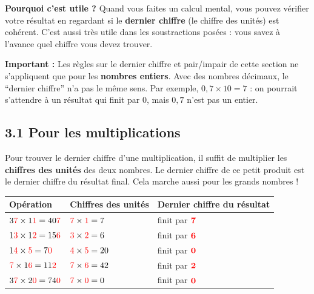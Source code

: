 \documentclass{exam}
\begin{document}
\begin{Indication}
\textbf{Pourquoi c'est utile ?} Quand vous faites un calcul mental, vous pouvez vérifier votre résultat en regardant si le \textbf{dernier chiffre} (le chiffre des unités) est cohérent. C'est aussi très utile dans les soustractions posées : vous savez à l'avance quel chiffre vous devez trouver.
\end{Indication}

\begin{tcolorbox}[colback=red!8, colframe=red!70, boxrule=0.5mm, arc=3mm]
\textbf{Important :} Les règles sur le dernier chiffre et pair/impair de cette section ne s'appliquent que pour les \textbf{nombres entiers}. Avec des nombres décimaux, le ``dernier chiffre'' n'a pas le même sens. Par exemple, $0{,}7 \times 10 = 7$ : on pourrait s'attendre à un résultat qui finit par $0$, mais $0{,}7$ n'est pas un entier.
\end{tcolorbox}

\subsection*{\textcolor{blue!60!black}{3.1 Pour les multiplications}}

Pour trouver le dernier chiffre d'une multiplication, il suffit de multiplier les \textbf{chiffres des unités} des deux nombres. Le dernier chiffre de ce petit produit est le dernier chiffre du résultat final. Cela marche aussi pour les grands nombres !

\begin{center}
\renewcommand{\arraystretch}{1.5}
\begin{tabular}{|l|l|l|}
\hline
\rowcolor{gray!20}
\textbf{Opération} & \textbf{Chiffres des unités} & \textbf{Dernier chiffre du résultat} \\
\hline
$3\textcolor{red}{7} \times 1\textcolor{red}{1} = 40\textcolor{red}{7}$ & $\textcolor{red}{7} \times \textcolor{red}{1} = 7$ & finit par $\textcolor{red}{\textbf{7}}$ \\
\hline
$1\textcolor{red}{3} \times 1\textcolor{red}{2} = 15\textcolor{red}{6}$ & $\textcolor{red}{3} \times \textcolor{red}{2} = 6$ & finit par $\textcolor{red}{\textbf{6}}$ \\
\hline
$1\textcolor{red}{4} \times \textcolor{red}{5} = 7\textcolor{red}{0}$ & $\textcolor{red}{4} \times \textcolor{red}{5} = 20$ & finit par $\textcolor{red}{\textbf{0}}$ \\
\hline
$\textcolor{red}{7} \times 1\textcolor{red}{6} = 11\textcolor{red}{2}$ & $\textcolor{red}{7} \times \textcolor{red}{6} = 42$ & finit par $\textcolor{red}{\textbf{2}}$ \\
\hline
$3\textcolor{red}{7} \times 2\textcolor{red}{0} = 74\textcolor{red}{0}$ & $\textcolor{red}{7} \times \textcolor{red}{0} = 0$ & finit par $\textcolor{red}{\textbf{0}}$ \\
\hline
\end{tabular}
\end{center}
\end{document}
